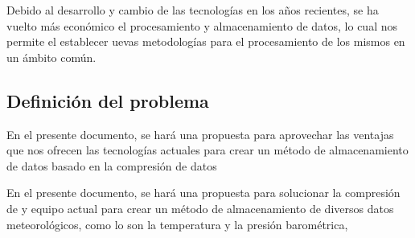 Debido al desarrollo y cambio de las tecnologías en los años recientes, se ha vuelto más económico el procesamiento y almacenamiento de datos, lo cual nos permite el establecer uevas metodologías para el procesamiento de los mismos en un ámbito común.

\subsection{Definición del problema}



En el presente documento, se hará una propuesta para aprovechar las ventajas que nos ofrecen las tecnologías actuales para crear un método de almacenamiento de datos basado en la compresión de datos

En el presente documento, se hará una propuesta para solucionar la compresión de  y equipo actual para crear un método de almacenamiento de diversos datos meteorológicos, como lo son la temperatura y la presión barométrica,
